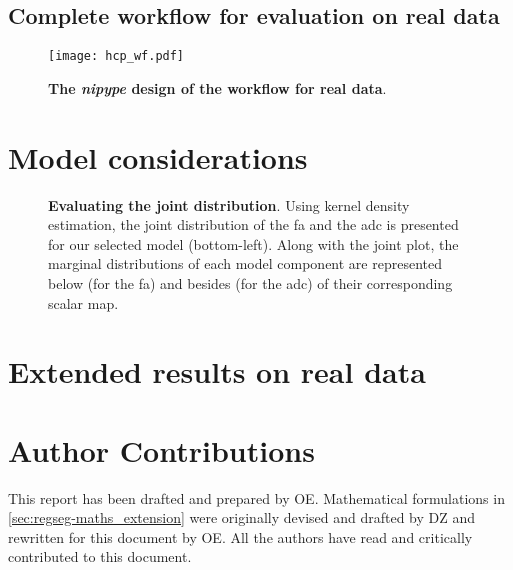 \documentclass[a4paper]{report}
\begin{document}
\subsection{Complete workflow for evaluation on real data}
\begin{figure}[!ht]
  \texttt{[image: hcp\_wf.pdf]}
  \caption{\textbf{The \emph{nipype} design of the workflow for real data}.}\label{fig:regseg-wf_hcp}
\end{figure}

\clearpage
\section{Model considerations}

%   

\begin{figure}[!ht]
  \centering
  \captionsetup{format=overlay}
  \caption{\textbf{Evaluating the joint distribution}.
  Using kernel density estimation, the joint distribution of the \gls*{fa} and the \gls{adc}
    is presented for our selected model (bottom-left).
  Along with the joint plot, the marginal distributions of each model component
    are represented below (for the \gls*{fa}) and besides (for the \gls*{adc}) of their corresponding
    scalar map.}
  \label{fig:regseg-jointplot}
\end{figure}

\clearpage
\section{Extended results on real data}

\immediate{}


\clearpage
\section*{Author Contributions}
This report has been drafted and prepared by OE.
Mathematical formulations in \autoref{sec:regseg-maths_extension} were originally devised and drafted
  by DZ and rewritten for this document by OE.
All the authors have read and critically contributed to this document.



\end{document}
